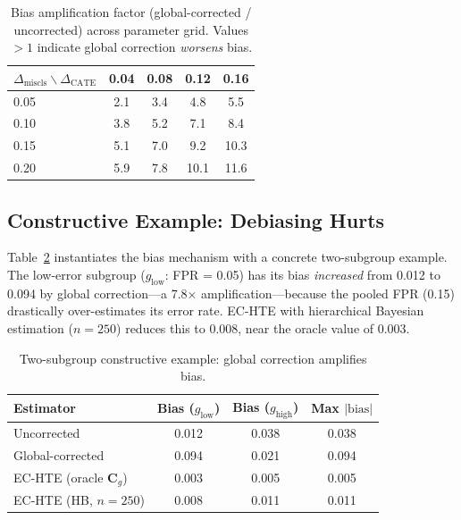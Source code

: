 \documentclass[11pt,a4paper]{article}
\begin{document}
\begin{table}[t]
\centering
\small
\caption{Bias amplification factor (global-corrected / uncorrected) across parameter grid. Values $>1$ indicate global correction \emph{worsens} bias.}
\label{tab:amplification}
\begin{tabular}{l cccc}
\toprule
$\Delta_{\text{miscls}} \backslash \Delta_{\text{CATE}}$ & 0.04 & 0.08 & 0.12 & 0.16 \\
\midrule
0.05 & 2.1 & 3.4 & 4.8 & 5.5 \\
0.10 & 3.8 & 5.2 & 7.1 & 8.4 \\
0.15 & 5.1 & 7.0 & 9.2 & 10.3 \\
0.20 & 5.9 & 7.8 & 10.1 & 11.6 \\
\bottomrule
\end{tabular}
\end{table}

\subsection{Constructive Example: Debiasing Hurts}

Table~\ref{tab:constructive} instantiates the bias mechanism with a concrete two-subgroup example.
The low-error subgroup ($g_{\text{low}}$: FPR = 0.05) has its bias \emph{increased} from 0.012 to 0.094 by global correction---a 7.8$\times$ amplification---because the pooled FPR (0.15) drastically over-estimates its error rate.
EC-HTE with hierarchical Bayesian estimation ($n = 250$) reduces this to 0.008, near the oracle value of 0.003.

\begin{table}[t]
\centering
\small
\caption{Two-subgroup constructive example: global correction amplifies bias.}
\label{tab:constructive}
\begin{tabular}{l ccc}
\toprule
Estimator & Bias ($g_{\text{low}}$) & Bias ($g_{\text{high}}$) & Max $|\text{bias}|$ \\
\midrule
Uncorrected & 0.012 & 0.038 & 0.038 \\
Global-corrected & 0.094 & 0.021 & 0.094 \\
EC-HTE (oracle $\mathbf{C}_g$) & 0.003 & 0.005 & 0.005 \\
EC-HTE (HB, $n=250$) & 0.008 & 0.011 & 0.011 \\
\bottomrule
\end{tabular}
\end{table}

\end{document}
